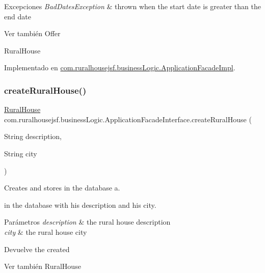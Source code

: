 \begin{DoxyExceptions}{Excepciones}
{\em Bad\+Dates\+Exception} & thrown when the start date is greater than the end date\\
\hline
\end{DoxyExceptions}
\begin{DoxySeeAlso}{Ver también}
Offer 

Rural\+House 
\end{DoxySeeAlso}


Implementado en \mbox{\hyperlink{a00132_a9aafb2ac6e91d643bc5dd1f5691d4075}{com.\+ruralhousejsf.\+business\+Logic.\+Application\+Facade\+Impl}}.

\mbox{\label{a00136_a7fc244cf74494e50a01148496d1b45ad}} 
\subsubsection{\texorpdfstring{createRuralHouse()}{createRuralHouse()}}
{\footnotesize\ttfamily \mbox{\hyperlink{a00188}{Rural\+House}} com.\+ruralhousejsf.\+business\+Logic.\+Application\+Facade\+Interface.\+create\+Rural\+House (\begin{DoxyParamCaption}\item[{String}]{description,  }\item[{String}]{city }\end{DoxyParamCaption})}



Creates and stores in the database a. 


\begin{DoxyCode}{0}
\end{DoxyCode}
 in the database with his description and his city.


\begin{DoxyParams}{Parámetros}
{\em description} & the rural house description \\
\hline
{\em city} & the rural house city\\
\hline
\end{DoxyParams}
\begin{DoxyReturn}{Devuelve}
the created
\begin{DoxyCode}{0}
\end{DoxyCode}

\end{DoxyReturn}
\begin{DoxySeeAlso}{Ver también}
Rural\+House 
\end{DoxySeeAlso}


